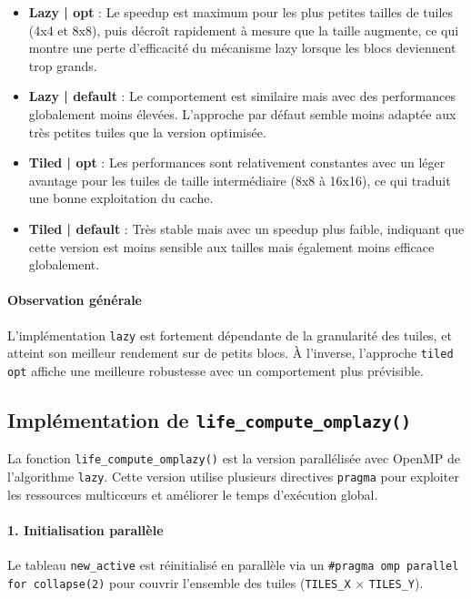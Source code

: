 \documentclass[a4paper,12pt]{article}
\begin{document}
\begin{itemize}
    \item \textbf{Lazy | opt} : Le speedup est maximum pour les plus petites tailles de tuiles (4x4 et 8x8), puis décroît rapidement à mesure que la taille augmente, ce qui montre une perte d’efficacité du mécanisme lazy lorsque les blocs deviennent trop grands.
    \item \textbf{Lazy | default} : Le comportement est similaire mais avec des performances globalement moins élevées. L’approche par défaut semble moins adaptée aux très petites tuiles que la version optimisée.
    \item \textbf{Tiled | opt} : Les performances sont relativement constantes avec un léger avantage pour les tuiles de taille intermédiaire (8x8 à 16x16), ce qui traduit une bonne exploitation du cache.
    \item \textbf{Tiled | default} : Très stable mais avec un speedup plus faible, indiquant que cette version est moins sensible aux tailles mais également moins efficace globalement.
\end{itemize}

\paragraph{Observation générale}

L’implémentation \texttt{lazy} est fortement dépendante de la granularité des tuiles, et atteint son meilleur rendement sur de petits blocs. À l’inverse, l’approche \texttt{tiled opt} affiche une meilleure robustesse avec un comportement plus prévisible.

\subsection{Implémentation de \texttt{life\_compute\_omplazy()}}

La fonction \texttt{life\_compute\_omplazy()} est la version parallélisée avec OpenMP de l’algorithme \texttt{lazy}. Cette version utilise plusieurs directives \texttt{pragma} pour exploiter les ressources multicœurs et améliorer le temps d’exécution global.

\paragraph{1. Initialisation parallèle}

Le tableau \texttt{new\_active} est réinitialisé en parallèle via un \texttt{\#pragma omp parallel for collapse(2)} pour couvrir l’ensemble des tuiles (\texttt{TILES\_X} $\times$ \texttt{TILES\_Y}).
\end{document}
